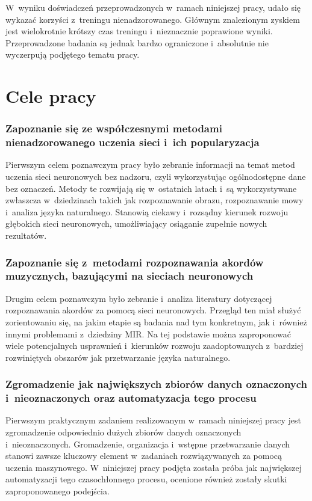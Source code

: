 W~wyniku doświadczeń przeprowadzonych w~ramach niniejszej pracy, udało się wykazać korzyści z~treningu nienadzorowanego. Głównym znalezionym zyskiem jest wielokrotnie krótszy czas treningu i~nieznacznie poprawione wyniki. Przeprowadzone badania są jednak bardzo ograniczone i~absolutnie nie wyczerpują podjętego tematu pracy.



\section{Cele pracy}

\subsubsection{Zapoznanie się ze współczesnymi metodami nienadzorowanego uczenia sieci i~ich popularyzacja}

Pierwszym celem poznawczym pracy było zebranie informacji na temat metod uczenia sieci neuronowych bez nadzoru, czyli wykorzystując ogólnodostępne dane bez oznaczeń. Metody te rozwijają się w~ostatnich latach i~są wykorzystywane zwłaszcza w~dziedzinach takich jak rozpoznawanie obrazu, rozpoznawanie mowy i~analiza języka naturalnego. Stanowią ciekawy i~rozsądny kierunek rozwoju głębokich sieci neuronowych, umożliwiający osiąganie zupełnie nowych rezultatów.

\subsubsection{Zapoznanie się z~metodami rozpoznawania akordów muzycznych, bazującymi na sieciach neuronowych}

Drugim celem poznawczym było zebranie i~analiza literatury dotyczącej rozpoznawania akordów za pomocą sieci neuronowych. Przegląd ten miał służyć zorientowaniu się, na jakim etapie są badania nad tym konkretnym, jak i~również innymi problemami z~dziedziny MIR. Na tej podstawie można zaproponować wiele potencjalnych usprawnień i~kierunków rozwoju zaadoptowanych z~bardziej rozwiniętych obszarów jak przetwarzanie języka naturalnego.

\subsubsection{Zgromadzenie jak największych zbiorów danych oznaczonych i~nieoznaczonych oraz automatyzacja tego procesu}

Pierwszym praktycznym zadaniem realizowanym w~ramach niniejszej pracy jest zgromadzenie odpowiednio dużych zbiorów danych oznaczonych i~nieoznaczonych. Gromadzenie, organizacja i~wstępne przetwarzanie danych stanowi zawsze kluczowy element w~zadaniach rozwiązywanych za pomocą uczenia maszynowego. W~niniejszej pracy podjęta została próba jak największej automatyzacji tego czasochłonnego procesu, ocenione również zostały skutki zaproponowanego podejścia.

